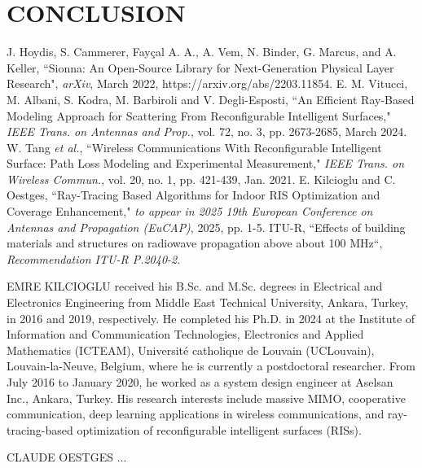 \documentclass{IEEEoj}
\begin{document}
\section{CONCLUSION}

\begin{thebibliography}{00}
	 J. Hoydis, S. Cammerer, Fayçal {A. A.}, A. Vem, N. Binder, G. Marcus, and A. Keller, “Sionna: An Open-Source Library for Next-Generation Physical Layer Research", \textit{arXiv}, March 2022, https://arxiv.org/abs/2203.11854.
	 E. M. Vitucci, M. Albani, S. Kodra, M. Barbiroli and V. Degli-Esposti, “An Efficient Ray-Based Modeling Approach for Scattering From Reconfigurable Intelligent Surfaces," \textit{IEEE Trans. on Antennas and Prop.}, vol. 72, no. 3, pp. 2673-2685, March 2024.
	 W. Tang \textit{et al.}, “Wireless Communications With Reconfigurable Intelligent Surface: Path Loss Modeling and Experimental Measurement," \textit{IEEE Trans. on Wireless Commun.}, vol. 20, no. 1, pp. 421-439, Jan. 2021.
	 E. Kilcioglu and C. Oestges, “Ray-Tracing Based Algorithms for Indoor RIS Optimization and Coverage Enhancement," \textit{to appear in 2025 19th European Conference on Antennas and Propagation (EuCAP)}, 2025, pp. 1-5.
	 ITU-R, “Effects of building materials and structures on radiowave propagation above about 100 MHz“, \textit{Recommendation ITU-R P.2040-2}. 
\end{thebibliography}


\begin{IEEEbiography}{EMRE KILCIOGLU } received his B.Sc. and M.Sc. degrees in Electrical and Electronics Engineering from Middle East Technical University, Ankara, Turkey, in 2016 and 2019, respectively. He completed his Ph.D. in 2024 at the Institute of Information and Communication Technologies, Electronics and Applied Mathematics (ICTEAM), Université catholique de Louvain (UCLouvain), Louvain-la-Neuve, Belgium, where he is currently a postdoctoral researcher. From July 2016 to January 2020, he worked as a system design engineer at Aselsan Inc., Ankara, Turkey. His research interests include massive MIMO, cooperative communication, deep learning applications in wireless communications, and ray-tracing-based optimization of reconfigurable intelligent surfaces (RISs).
\end{IEEEbiography}

\begin{IEEEbiography}{CLAUDE OESTGES } ...
\end{IEEEbiography}
\end{document}
